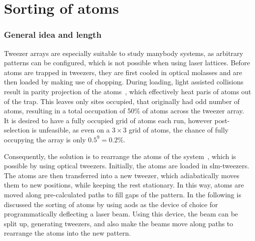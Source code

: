 \chapter{Sorting of atoms}%
\label{sec:sorting}

\subsection*{General idea and length}


Tweezer arrays are especially suitable to study manybody systems, as arbitrary patterns can be configured, which is not possible when using laser lattices. Before atoms are trapped in tweezers, they are first cooled in optical molasses and are then loaded by making use of chopping. During loading, light assisted collisions result in parity projection of the atoms~\cite{Cooper2018}, which effectively heat paris of atoms out of the trap. This leaves only sites occupied, that originally had odd number of atoms, resulting in a total occupation of 50\% of atoms across the tweezer array. It is desired to have a fully occupied grid of atoms each run, however post-selection is unfeasible, as even on a $3\times3$ grid of atoms, the chance of fully occupying the array is only $0.5^9 = 0.2\%$.

Consequently, the solution is to rearrange the atoms of the system~\cite{Barredo2016, Endres2016}, which is possible by using optical tweezers. Initially, the atoms are loaded in \ac{slm}-tweezers. The atoms are then transferred into a new tweezer, which adiabatically moves them to new positions, while keeping the rest stationary. In this way, atoms are moved along pre-calculated paths to fill gaps of the pattern. In the following is discussed the sorting of atoms by using \acp{aod} as the device of choice for programmatically deflecting a laser beam. Using this device, the beam can be split up, generating tweezers, and also make the beams move along paths to rearrange the atoms into the new pattern.


